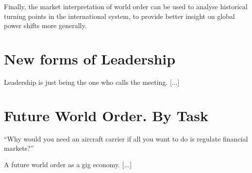 Finally, the market interpretation of world order can be used
to analyse historical turning points in the international system,
to provide better insight on global power shifts more generally.

\section{New forms of Leadership}

Leadership is just being the one who calls the meeting. [$\dots$]


\section{Future World Order. By Task}

``Why would you need an aircraft carrier if all you want to do
is regulate financial markets?''

A future world order as a gig economy. [$\dots$]

%
